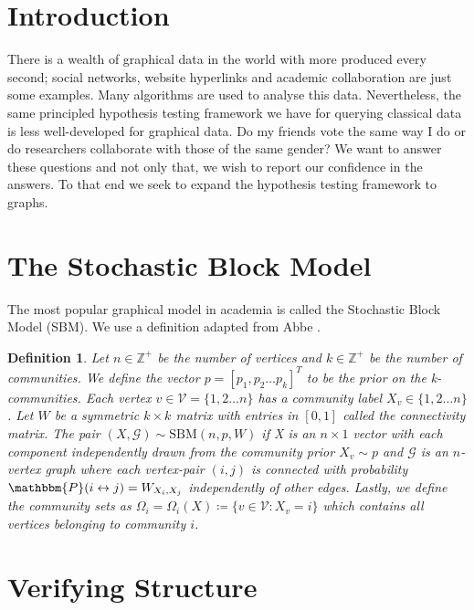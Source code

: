 \documentclass[11pt]{article}
\newcommand{\Gcal}{\mathcal{G}}
\newcommand{\Vcal}{\mathcal{V}}
\newcommand{\Integers}{\mathbb{Z}}
\newcommand{\prob}{\mathbbm{P}}
\newtheorem{definition}{Definition}[section]
\begin{document}
\begin{multicols*}{2}

\section{Introduction}

There is a wealth of graphical data in the world with more produced every second; social networks, website hyperlinks and academic collaboration are just some examples. Many algorithms are used to analyse this data. Nevertheless, the same principled hypothesis testing framework we have for querying classical data is less well-developed for graphical data. Do my friends vote the same way I do or do researchers collaborate with those of the same gender? We want to answer these questions and not only that, we wish to report our confidence in the answers. To that end we seek to expand the hypothesis testing framework to graphs.

\section{The Stochastic Block Model}

The most popular graphical model in academia is called the Stochastic Block Model (SBM). We use a definition adapted from Abbe \cite{Abbe}.

\begin{definition}
	\label{defn:sbm}
	Let $n \in \Integers^+$ be the number of vertices and $k \in \Integers^+$ be the number of communities. We define the vector $p = [p_1, p_2 \dots p_k]^T$ to be the prior on the k-communities. Each vertex $v \in \Vcal = \{1, 2 \dots n\}$ has a community label $X_v \in \{1, 2 \dots n\}$. Let $W$ be a symmetric $k \times k$ matrix with entries in $[0,1]$ called the connectivity matrix. The pair $(X, \Gcal) \sim \textrm{SBM}(n, p, W)$ if X is an $n \times 1$ vector with each component independently drawn from the community prior $X_v \sim p$ and $\Gcal$ is an $n$-vertex graph where each vertex-pair $(i, j)$ is connected with probability $\prob(i \leftrightarrow j) = W_{X_i, X_j}$ independently of other edges. Lastly, we define the community sets as $\Omega_i = \Omega_i(X) \coloneqq \{v \in \Vcal : X_v = i\}$ which contains all vertices belonging to community $i$.
\end{definition}

\section{Verifying Structure}

\end{multicols*}
\end{document}
